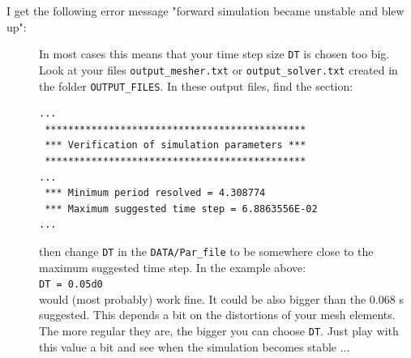 \begin{description}
\item [{I get the following error message "forward simulation became unstable and blew up":}] In
most cases this means that your time step size \texttt{DT} is chosen
too big. Look at your files \texttt{output\_mesher.txt} or \texttt{output\_solver.txt}
created in the folder \texttt{OUTPUT\_FILES}. In these output files,
find the section:

{\footnotesize
\begin{verbatim}
...
 *********************************************
 *** Verification of simulation parameters ***
 *********************************************
...
 *** Minimum period resolved = 4.308774
 *** Maximum suggested time step = 6.8863556E-02
...
\end{verbatim}
}

then change \texttt{DT} in the \texttt{DATA/Par\_file} to be somewhere
close to the maximum suggested time step. In the example above: \\
 \texttt{DT = 0.05d0} \\
 would (most probably) work fine. It could be also bigger than the
0.068 s suggested. This depends a bit on the distortions of your mesh
elements. The more regular they are, the bigger you can choose \texttt{DT}.
Just play with this value a bit and see when the simulation becomes
stable ...

\end{description}


